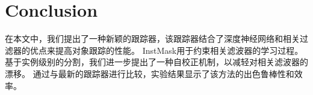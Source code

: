 \section{Conclusion}
在本文中，我们提出了一种新颖的跟踪器，该跟踪器结合了深度神经网络和相关过滤器的优点来提高对象跟踪的性能。
InstMask用于约束相关滤波器的学习过程。基于实例级别的分割，我们进一步提出了一种自校正机制，以减轻对相关滤波器的漂移。
通过与最新的跟踪器进行比较，实验结果显示了该方法的出色鲁棒性和效率。